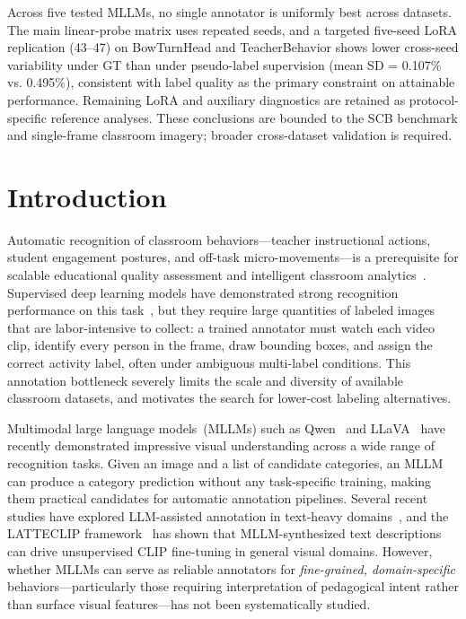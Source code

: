 \documentclass[10pt,letterpaper]{article}
\begin{document}
Across five tested MLLMs, no single annotator is uniformly best across
datasets.
The main linear-probe matrix uses repeated seeds, and a targeted
five-seed LoRA replication (43--47) on BowTurnHead and TeacherBehavior
shows lower cross-seed variability under GT than under pseudo-label
supervision (mean SD = 0.107\% vs. 0.495\%), consistent with label
quality as the primary constraint on attainable performance.
Remaining LoRA and auxiliary diagnostics are retained as
protocol-specific reference analyses.
These conclusions are bounded to the SCB benchmark and single-frame
classroom imagery; broader cross-dataset validation is required.

\clearpage
{}
\linenumbers

\section*{Introduction}
\label{sec:intro}

Automatic recognition of classroom behaviors---teacher instructional
actions, student engagement postures, and off-task micro-movements---is
a prerequisite for scalable educational quality assessment and
intelligent classroom analytics~\cite{brophy2000teaching,anderson2004classroom}.
Supervised deep learning models have demonstrated strong recognition
performance on this task~\cite{li2022classroom_transformer,zhang2020classroom_cnn},
but they require large quantities of labeled images that are
labor-intensive to collect: a trained annotator must watch each video
clip, identify every person in the frame, draw bounding boxes, and
assign the correct activity label, often under ambiguous multi-label
conditions.
This annotation bottleneck severely limits the scale and diversity of
available classroom datasets, and motivates the search for
lower-cost labeling alternatives.

Multimodal large language models~(MLLMs) such as
Qwen~\cite{bai2023qwen} and LLaVA~\cite{liu2023llava}
have recently demonstrated impressive visual understanding across a
wide range of recognition tasks.
Given an image and a list of candidate categories, an MLLM can produce
a category prediction without any task-specific training, making them
practical candidates for automatic annotation pipelines.
Several recent studies have explored LLM-assisted annotation in
text-heavy domains~\cite{gilardi2023chatgpt,he2023annollm}, and
the LATTECLIP framework~\cite{cao2025latteclip} has shown that
MLLM-synthesized text descriptions can drive unsupervised CLIP
fine-tuning in general visual domains.
However, whether MLLMs can serve as reliable annotators for
\emph{fine-grained, domain-specific} behaviors---particularly those
requiring interpretation of pedagogical intent rather than surface
visual features---has not been systematically studied.
\end{document}
